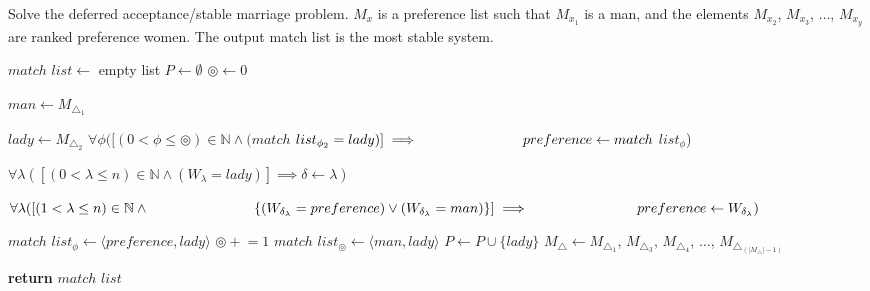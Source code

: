 \documentclass[a4paper, 12pt]{article}
\newcommand{\pluseq}{\mathrel{+}=}
\begin{document}
	
	\begin{algorithm}

		\renewcommand{\thealgorithm}{3.1.59}
		
		\caption{Solve the deferred acceptance/stable marriage problem. $M_x$ is a preference list such that $M_{x_1}$ is a man, and the elements $M_{x_2}$, $M_{x_3}$, $\dots$, $M_{x_y}$ are ranked  preference women. The output match list is the most stable system.}
		
		\begin{algorithmic}[1]
			
			
			\State $match$ $list \gets $ empty list
			\State $P \gets \emptyset$
			\State $\circledcirc \gets 0$
			
					\State $man \gets M_{\triangle_{1}}$
					
					
						\State $lady \gets M_{\triangle_{2}}$
						 
							\State$\forall \phi ([(0 < \phi \le \circledcirc) \in \mathbb{N}\land (match$ $list_{\phi_{2}} = lady)] \implies \newline \indent \indent \indent \indent \indent
							preference \gets match$ $list_\phi$)
							
							\State
							$\forall \lambda ([(0 < \lambda \le n) \in \mathbb{N} \land (W_\lambda = lady)] \implies \delta \gets \lambda)$
							
							
							\State
							$\forall \lambda ([(1 < \lambda \le n) \in \mathbb{N} \land \newline \indent \indent \indent \indent \indent  \{(W_{\delta_{\lambda}} = preference) \lor (W_{\delta_{\lambda}} = man)\}] \implies \indent \indent \indent \indent \indent preference \gets W_{\delta_{\lambda}})$
							
							\State $match$ $list_\phi \gets \langle preference, lady\rangle$
						\Else
							\State $\circledcirc \pluseq 1$
							\State $match$ $list_\circledcirc \gets \langle man, lady \rangle$
							\State $P \gets P \cup \{lady\}$
							\State $M_\triangle \gets M_{\triangle_{1}}$, $M_{\triangle_{3}}$,
							$M_{\triangle_{4}}$,
							$\dots$,
							$M_{\triangle_{(|M_\triangle|-1)}}$
						\EndIf
						
					\EndIf
					
				\EndFor
			
			\EndWhile
			
			\State \textbf{return} $match$ $list$
			\EndProcedure
			
		\end{algorithmic}

	\end{algorithm}
\end{document}
